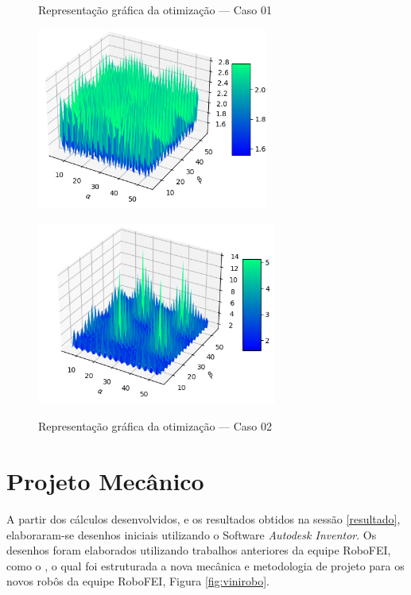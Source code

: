 \documentclass[deposito, acronym, symbols]{fei}
\begin{document}
\begin{figure}[!htp]
\begin{minipage}{0.5\textwidth}
    \caption{Representação gráfica da otimização — Caso 01}
    \includegraphics[width=0.9\linewidth, height=6cm]{Imagens/Figure_0_5_Vx.png} 
    \label{fig:angulo0.5}
\end{minipage}\hfill
\begin{minipage}{0.5\textwidth}
    \caption{Representação gráfica da otimização — Caso 02}
    \includegraphics[width=0.9\linewidth, height=6cm]
    {Imagens/Figure_0_1_Vx.png}
    \label{fig:angulo0.1}
\end{minipage}
\end{figure}


\section{Projeto Mecânico}

A partir dos cálculos desenvolvidos, e os resultados obtidos na sessão \ref{resultado}, elaboraram-se desenhos iniciais utilizando o Software \textit{Autodesk Inventor}. Os desenhos foram elaborados utilizando trabalhos anteriores da equipe RoboFEI, como o \textcite{vinirobofei}, o qual foi estruturada a nova mecânica e metodologia de projeto para os novos robôs da equipe RoboFEI, Figura \ref{fig:vinirobo}.
\end{document}
